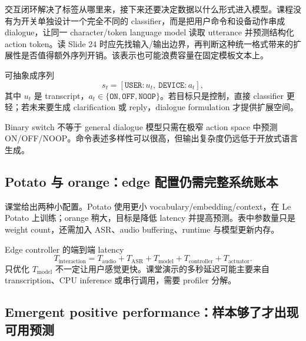 交互闭环解决了标签从哪里来，接下来还要决定数据以什么形式进入模型。课程没有为开关单独设计一个完全不同的 classifier，而是把用户命令和设备动作串成 dialogue，让同一 character/token language model 读取 utterance 并预测结构化 action token。读 Slide 24 时应先找输入/输出边界，再判断这种统一格式带来的扩展性是否值得额外序列开销。该表示也可能浪费容量在固定模板文本上。


可抽象成序列
\[
s_t=[\texttt{USER}:u_t,\ \texttt{DEVICE}:a_t],
\]
其中 $u_t$ 是 transcript，$a_t\in\{\texttt{ON},\texttt{OFF},\texttt{NOOP}\}$。若目标只是控制，直接 classifier 更轻；若未来要生成 clarification 或 reply，dialogue formulation 才提供扩展空间。

\begin{warningbox}{Binary switch 不等于 general dialogue}
模型只需在极窄 action space 中预测 ON/OFF/NOOP。命令表述多样性可以很高，但输出复杂度仍远低于开放式语言生成。
\end{warningbox}

\subsection{Potato 与 orange：edge 配置仍需完整系统账本}

课堂给出两种小配置。Potato 使用更小 vocabulary/embedding/context，在 Le Potato 上训练；orange 稍大，目标是降低 latency 并提高预测。表中参数量只是 weight count，还需加入 ASR、audio buffering、runtime 与模型更新内存。


\begin{knowledgebox}{Edge controller 的端到端 latency}
\[
T_{\text{interaction}}=T_{\text{audio}}+T_{\text{ASR}}+T_{\text{model}}
+T_{\text{controller}}+T_{\text{actuator}}.
\]
只优化 $T_{\text{model}}$ 不一定让用户感觉更快。课堂演示的多秒延迟可能主要来自 transcription、CPU inference 或串行调用，需要 profiler 分解。
\end{knowledgebox}


\subsection{Emergent positive performance：样本够了才出现可用预测}

